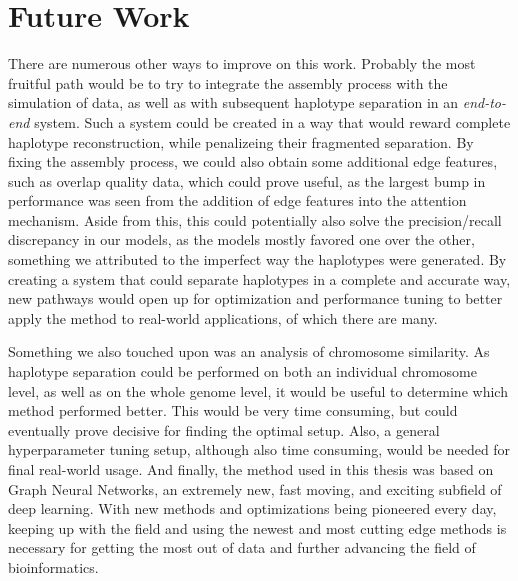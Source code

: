 \documentclass[times, utf8, diplomski, english]{fer_eng}
\begin{document}
\section{Future Work}

There are numerous other ways to improve on this work. Probably the most fruitful path would be to try to integrate the assembly process with the simulation of data, as well as with subsequent haplotype separation in an \textit{end-to-end} system. Such a system could be created in a way that would reward complete haplotype reconstruction, while penalizeing their fragmented separation. By fixing the assembly process, we could also obtain some additional edge features, such as overlap quality data, which could prove useful, as the largest bump in performance was seen from the addition of edge features into the attention mechanism. Aside from this, this could potentially also solve the precision/recall discrepancy in our models, as the models mostly favored one over the other, something we attributed to the imperfect way the haplotypes were generated. By creating a system that could separate haplotypes in a complete and accurate way, new pathways would open up for optimization and performance tuning to better apply the method to real-world applications, of which there are many.

Something we also touched upon was an analysis of chromosome similarity. As haplotype separation could be performed on both an individual chromosome level, as well as on the whole genome level, it would be useful to determine which method performed better. This would be very time consuming, but could eventually prove decisive for finding the optimal setup. Also, a general hyperparameter tuning setup, although also time consuming, would be needed for final real-world usage. And finally, the method used in this thesis was based on Graph Neural Networks, an extremely new, fast moving, and exciting subfield of deep learning. With new methods and optimizations being pioneered every day, keeping up with the field and using the newest and most cutting edge methods is necessary for getting the most out of data and further advancing the field of bioinformatics.




\clearpage
\end{document}
